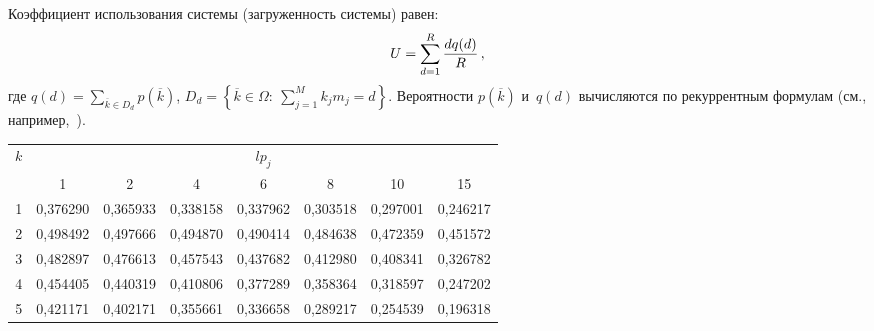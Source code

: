 \begin{multicols}{2}
Коэффициент использования сис\-те\-мы (загруженность сис\-те\-мы) равен:
\begin{equation}
U=\sum\limits_{d=1}^R \displaystyle\frac{\displaystyle dq(d)\mathstrut}{\displaystyle R\mathstrut}\,,
\label{e4ag}
\end{equation}
где $q(d) =\sum\limits_{\overline{k}\in D_d} p(\overline{k})$, $D_d=\left\{ 
\overline{k}\in \Omega:\ \sum\limits_{j=1}^M k_j m_j =d\right\}$.
Вероятности $p(\overline{k})$ и~$q(d)$ вычисляются по рекуррентным 
формулам (см., например,~\cite{13ag, 14ag, 16ag}).

\begin{table*}[b]\small
\begin{center}
\vspace*{2ex}

\begin{tabular}{|c|c|c|c|c|c|c|c|}
\hline
$k$ & \multicolumn{7}{c|}{$lp_j$}\\
\cline{2-8}
 &1&2&4&6&8&10&15\\
 \hline
1&0,376290&0,365933&0,338158&0,337962&0,303518&0,297001&0,246217\\
2&0,498492&0,497666&0,494870&0,490414&0,484638&0,472359&0,451572\\
3&0,482897&0,476613&0,457543&0,437682&0,412980&0,408341&0,326782\\
4&0,454405&0,440319&0,410806&0,377289&0,358364&0,318597&0,247202\\
5&0,421171&0,402171&0,355661&0,336658&0,289217&0,254539&0,196318\\
\hline
\end{tabular}
\end{center}
\renewcommand{\figurename}{\protect\bf Таблица}
\renewcommand{\tablename}{\protect\bf Рис.}
\vspace*{12pt}
\begin{center}
\mbox{%
\epsfxsize=80.012mm
}
\end{center}
\vspace*{-9pt}
\end{table*}



\end{multicols}
